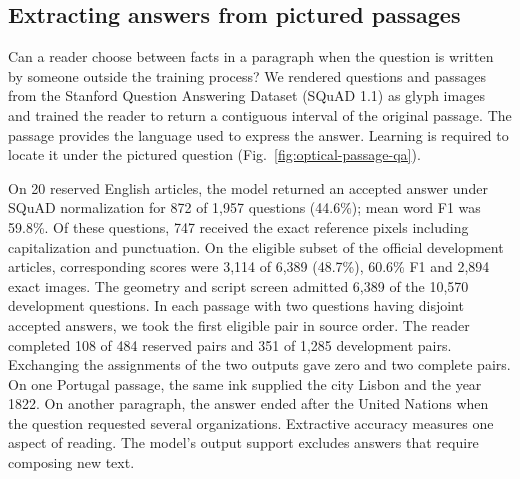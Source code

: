 \subsection*{Extracting answers from pictured passages}
Can a reader choose between facts in a paragraph when the question is written by someone outside the training process? We rendered questions and passages from the Stanford Question Answering Dataset (SQuAD 1.1) as glyph images and trained the reader to return a contiguous interval of the original passage. The passage provides the language used to express the answer. Learning is required to locate it under the pictured question (Fig.~\ref{fig:optical-passage-qa}).

On 20 reserved English articles, the model returned an accepted answer under SQuAD normalization for 872 of 1,957 questions (44.6\%); mean word F1 was 59.8\%. Of these questions, 747 received the exact reference pixels including capitalization and punctuation. On the eligible subset of the official development articles, corresponding scores were 3,114 of 6,389 (48.7\%), 60.6\% F1 and 2,894 exact images. The geometry and script screen admitted 6,389 of the 10,570 development questions. In each passage with two questions having disjoint accepted answers, we took the first eligible pair in source order. The reader completed 108 of 484 reserved pairs and 351 of 1,285 development pairs. Exchanging the assignments of the two outputs gave zero and two complete pairs. On one Portugal passage, the same ink supplied the city Lisbon and the year 1822. On another paragraph, the answer ended after the United Nations when the question requested several organizations. Extractive accuracy measures one aspect of reading. The model's output support excludes answers that require composing new text.
